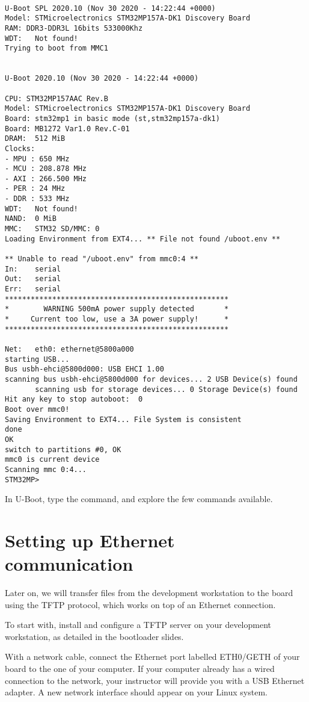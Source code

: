 \begin{verbatim}

U-Boot SPL 2020.10 (Nov 30 2020 - 14:22:44 +0000)
Model: STMicroelectronics STM32MP157A-DK1 Discovery Board
RAM: DDR3-DDR3L 16bits 533000Khz
WDT:   Not found!
Trying to boot from MMC1


U-Boot 2020.10 (Nov 30 2020 - 14:22:44 +0000)

CPU: STM32MP157AAC Rev.B
Model: STMicroelectronics STM32MP157A-DK1 Discovery Board
Board: stm32mp1 in basic mode (st,stm32mp157a-dk1)
Board: MB1272 Var1.0 Rev.C-01
DRAM:  512 MiB
Clocks:
- MPU : 650 MHz
- MCU : 208.878 MHz
- AXI : 266.500 MHz
- PER : 24 MHz
- DDR : 533 MHz
WDT:   Not found!
NAND:  0 MiB
MMC:   STM32 SD/MMC: 0
Loading Environment from EXT4... ** File not found /uboot.env **

** Unable to read "/uboot.env" from mmc0:4 **
In:    serial
Out:   serial
Err:   serial
****************************************************
*        WARNING 500mA power supply detected       *
*     Current too low, use a 3A power supply!      *
****************************************************

Net:   eth0: ethernet@5800a000
starting USB...
Bus usbh-ehci@5800d000: USB EHCI 1.00
scanning bus usbh-ehci@5800d000 for devices... 2 USB Device(s) found
       scanning usb for storage devices... 0 Storage Device(s) found
Hit any key to stop autoboot:  0
Boot over mmc0!
Saving Environment to EXT4... File System is consistent
done
OK
switch to partitions #0, OK
mmc0 is current device
Scanning mmc 0:4...
STM32MP>
\end{verbatim}

In U-Boot, type the  command, and explore the few commands
available.

\section{Setting up Ethernet communication}

Later on, we will transfer files from the development workstation to
the board using the TFTP protocol, which works on top of an Ethernet
connection.

To start with, install and configure a TFTP server on your development
workstation, as detailed in the bootloader slides.

With a network cable, connect the Ethernet port labelled ETH0/GETH of
your board to the one of your computer. If your computer already has a
wired connection to the network, your instructor will provide you with
a USB Ethernet adapter. A new network interface should appear on your
Linux system.

